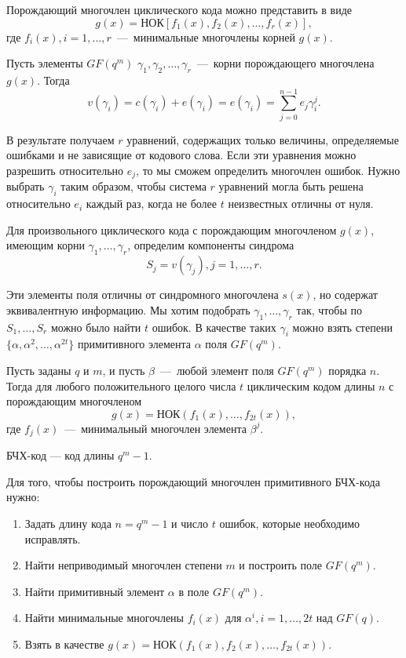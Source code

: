 Порождающий многочлен циклического кода можно представить в виде
$$g(x)=НОК\left[f_1(x), f_2(x), \ldots, f_r(x)\right],$$ где $f_i(x), i=1, \ldots, r$~---~минимальные
многочлены корней $g(x)$.

Пусть элементы $GF(q^m)$ $\gamma_1, \gamma_2, \ldots, \gamma_r$~---~корни порождающего многочлена
$g(x)$. Тогда $$v(\gamma_i)=c(\gamma_i)+e(\gamma_i)=e(\gamma_i)=\sum\limits_{j = 0}^{n - 1} {e_j \gamma _i^j }.$$

В результате получаем $r$ уравнений, содержащих только величины, определяемые ошибками и не зависящие от 
кодового слова. Если эти уравнения можно разрешить относительно $e_j$, то мы сможем определить многочлен 
ошибок. Нужно выбрать $\gamma_i$ таким образом, чтобы система $r$ уравнений могла быть решена относительно $e_
i$ каждый раз, когда не более $t$ неизвестных отличны от нуля.

Для произвольного циклического кода с порождающим многочленом $g(x)$, имеющим корни $\gamma_1, \ldots, \gamma_
r$, определим компоненты синдрома $$S_j=v(\gamma_j), j=1, \ldots, r.$$

Эти элементы поля отличны от синдромного многочлена $s(x)$, но содержат эквивалентную информацию. Мы хотим 
подобрать $\gamma_1, \ldots, \gamma_r$ так, чтобы по $S_1, \ldots, S_r$ можно было найти $t$ ошибок. В 
качестве таких $\gamma_i$ можно взять степени $\{\alpha, \alpha^2, \ldots, \alpha^{2t}\}$ примитивного 
элемента $\alpha$ поля $GF(q^m)$.

\begin{definition} 
Пусть заданы $q$ и $m$, и пусть $\beta$~---~любой элемент поля $GF(q^m)$ порядка $n$. Тогда для любого 
положительного целого числа $t$ %
циклическим кодом длины $n$ с порождающим многочленом $$g(x)=НОК\left(f_{1}\left(x\right), \ldots, 
f_{2t}\left(x\right)\right),$$ где $f_j(x)$~---~минимальный многочлен элемента $\beta^j$.
\end{definition}


\begin{definition} 
 БЧХ-код --- код длины $q^m-1$.
\end{definition}

Для того, чтобы построить порождающий многочлен примитивного БЧХ-кода нужно:
\begin{enumerate}
  \item Задать длину кода $n=q^m-1$ и число $t$ ошибок, которые необходимо исправлять.
  \item Найти неприводимый многочлен степени $m$ и построить поле $GF(q^m)$.
  \item Найти примитивный элемент $\alpha$ в поле $GF(q^m)$.
  \item Найти минимальные многочлены $f_i(x)$ для $\alpha^i, i=1, \ldots, 2t$ над $GF(q)$.
  \item Взять в качестве $g(x)=НОК\left({f_1(x), f_2(x), \ldots, f_{2t}(x)}\right).$
\end{enumerate}

